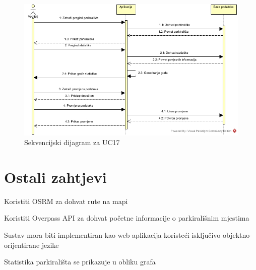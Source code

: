 \begin{figure}[H]
\centering
\includegraphics[width=\textwidth]{slike/SD_UC17.JPG} 
\caption{Sekvencijski dijagram za UC17}
\label{fig:promjene11} 
\end{figure}

\eject

\section{Ostali zahtjevi}


\begin{packed_enum}

\item Koristiti OSRM za dohvat rute na mapi
\item Koristiti Overpass API za dohvat početne informacije o parkirališnim mjestima
\item Sustav mora biti implementiran kao web aplikacija koristeći isključivo objektno-orijentirane jezike
\item Statistika parkirališta se prikazuje u obliku grafa

\end{packed_enum}



